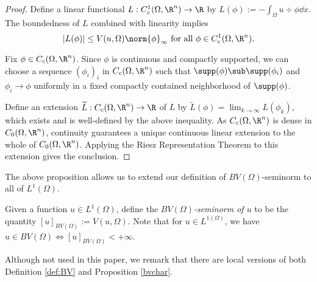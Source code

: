 \documentclass[../main.tex]{subfiles}
\begin{document}
\begin{proof}
    Define a linear functional $ L:C_{c}^{1}(\Omega,\R^{n})\to \R $ by $ L(\phi):= -\int_{\Omega}u\div{\phi} \dd{x} $. The boundedness of $ L $ combined with linearity implies
    \[
        |L(\phi)|\leq V(u,\Omega)\norm{\phi}_{\infty}\text{ for all } \phi\in C_{c}^{1}(\Omega,\R^{n}).
    \]

    Fix $ \phi\in C_{c}(\Omega,\R^{n}) $. Since $ \phi $ is continuous and compactly supported, we can choose a sequence $ (\phi_{i})_{i} $ in $ C_{c}(\Omega,\R^{n}) $ such that $ \supp(\phi)\sub \supp(\phi_{i}) $ and $ \phi_{i}\to \phi $ uniformly in a fixed compactly contained neighborhood of $ \supp(\phi) $. 

    Define an extension $ \widetilde{L}:C_{c}(\Omega,\R^{n})\to \R $ of $ L $ by $ \widetilde{L}(\phi) = \lim_{k\to\infty}L(\phi_{k}) $, which exists and is well-defined by the above inequality. As $ C_{c}(\Omega, \R^{n}) $ is dense in $ C_{0}(\Omega, \R^{n}) $, continuity guarantees a unique continuous linear extension to the whole of $ C_{0}(\Omega,\R^{n}) $. Applying the Riesz Representation Theorem to this extension gives the conclusion.
\end{proof}
The above proposition allows us to extend our definition of $ BV(\Omega) $-seminorm to all of $ L^{1}(\Omega) $.
\begin{definition}
    Given a function $ u\in L^{1}(\Omega) $, define the \textit{$ BV(\Omega) $-seminorm of $ u $} to be the quantity $ [u]_{BV(\Omega)} := V(u,\Omega) $. Note that for $ u\in L^{1(\Omega)} $, we have $ u\in BV(\Omega)\iff [u]_{BV(\Omega)} <+\infty $.
\end{definition}

\begin{remark}
    Although not used in this paper, we remark that there are local versions of both Definition \ref{def:BV} and Proposition \ref{bvchar}.
\end{remark}


\end{document}
